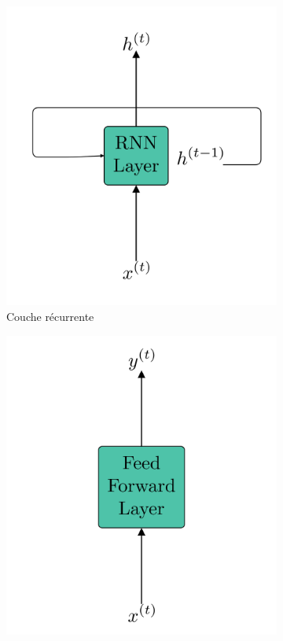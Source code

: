\begin{figure}[hbt]
    \begin{center}
        \begin{subfigure}{.4\linewidth}
            \includegraphics[width=\linewidth]{assets/images/rnn-loop}
            \caption{Couche récurrente}
            \label{fig.rnn-loop}
        \end{subfigure}
        \begin{subfigure}{.4\linewidth}
            \includegraphics[width=\linewidth]{assets/images/ffn-layers}

\end{subfigure}
\end{center}
\end{figure}
